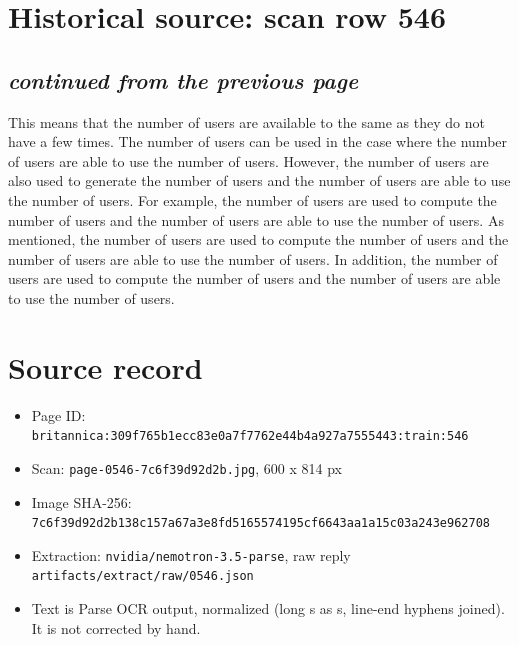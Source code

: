 \documentclass[10pt]{article}
\begin{document}
\section*{Historical source: scan row 546}
\subsection*{\textit{continued from the previous page}}
This means that the number of users are available to the same as they do not have a few times. The number of users can be used in the case where the number of users are able to use the number of users. However, the number of users are also used to generate the number of users and the number of users are able to use the number of users. For example, the number of users are used to compute the number of users and the number of users are able to use the number of users. As mentioned, the number of users are used to compute the number of users and the number of users are able to use the number of users. In addition, the number of users are used to compute the number of users and the number of users are able to use the number of users.
\section*{Source record}
\begin{itemize}
\item Page ID: \texttt{britannica:309f765b1ecc83e0a7f7762e44b4a927a7555443:train:546}
\item Scan: \texttt{page-0546-7c6f39d92d2b.jpg}, 600 x 814 px
\item Image SHA-256: \texttt{\small 7c6f39d92d2b138c157a67a3e8fd5165574195cf6643aa1a15c03a243e962708}
\item Extraction: \texttt{nvidia/nemotron-3.5-parse}, raw reply \texttt{artifacts/extract/raw/0546.json}
\item Text is Parse OCR output, normalized (long s as s, line-end hyphens joined). It is not corrected by hand.
\end{itemize}
\end{document}
